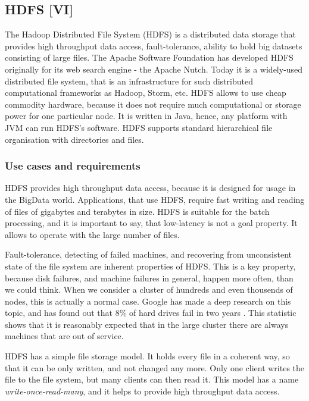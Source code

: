 \subsection{HDFS [VI]}

The Hadoop Distributed File System (HDFS) \cite{HDFSArchitecture1} \cite{HDFSArchitecture2} is a distributed data storage that provides high throughput data access, fault-tolerance, ability to hold big datasets consisting of large files.
The Apache Software Foundation has developed HDFS originally for its web search engine - the Apache Nutch.
Today it is a widely-used distributed file system, that is an infrastructure for such distributed computational frameworks as Hadoop, Storm, etc.
HDFS allows to use cheap commodity hardware, because it does not require much computational or storage power for one particular node.
It is written in Java, hence, any platform with JVM \cite{JVM} can run HDFS's software.
HDFS supports standard hierarchical file organisation with directories and files.

\subsubsection{Use cases and requirements}

HDFS provides high throughput data access, because it is designed for usage in the BigData world.
Applications, that use HDFS, require fast writing and reading of files of gigabytes and terabytes in size.
HDFS is suitable for the batch processing, and it is important to say, that low-latency is not a goal property.
It allows to operate with the large number of files.

Fault-tolerance, detecting of failed machines, and recovering from unconsistent state of the file system are inherent properties of HDFS.
This is a key property, because disk failures, and machine failures in general, happen more often, than we could think.
When we consider a cluster of hundreds and even thousends of nodes, this is actually a normal case.
Google has made a deep research on this topic, and has found out that $8\%$ of hard drives fail in two years \cite{Pinheiro2007}.
This statistic shows that it is reasonably expected that in the large cluster there are always machines that are out of service.

HDFS has a simple file storage model.
It holds every file in a coherent way, so that it can be only written, and not changed any more.
Only one client writes the file to the file system, but many clients can then read it.
This model has a name \textit{write-once-read-many}, and it helps to provide high throughput data access.

